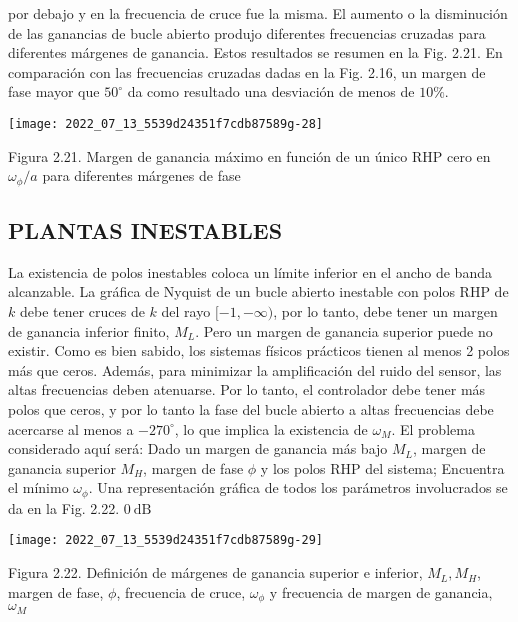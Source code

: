 por debajo y en la frecuencia de cruce fue la misma. El aumento o la disminución de las ganancias de bucle abierto produjo diferentes frecuencias cruzadas para diferentes márgenes de ganancia. Estos resultados se resumen en la Fig. 2.21. En comparación con las frecuencias cruzadas dadas en la Fig. 2.16, un margen de fase mayor que $50^{\circ}$ da como resultado una desviación de menos de $10 \%$.

\texttt{[image: 2022\_07\_13\_5539d24351f7cdb87589g-28]}

Figura 2.21. Margen de ganancia máximo en función de un único RHP cero en $\omega_{\phi} / a$ para diferentes márgenes de fase

\subsection{PLANTAS INESTABLES}
La existencia de polos inestables coloca un límite inferior en el ancho de banda alcanzable. La gráfica de Nyquist de un bucle abierto inestable con polos RHP de $k$ debe tener cruces de $k$ del rayo $[-1,-\infty)$, por lo tanto, debe tener un margen de ganancia inferior finito, $M_{L}$. Pero un margen de ganancia superior puede no existir. Como es bien sabido, los sistemas físicos prácticos tienen al menos 2 polos más que ceros. Además, para minimizar la amplificación del ruido del sensor, las altas frecuencias deben atenuarse. Por lo tanto, el controlador debe tener más polos que ceros, y por lo tanto la fase del bucle abierto a altas frecuencias debe acercarse al menos a $-270^{\circ}$, lo que implica la existencia de $\omega_{M}$. El problema considerado aquí será: Dado un margen de ganancia más bajo $M_{L}$, margen de ganancia superior $M_{H}$, margen de fase $\phi$ y los polos RHP del sistema; Encuentra el mínimo $\omega_{\phi}$. Una representación gráfica de todos los parámetros involucrados se da en la Fig. 2.22. $0 \mathrm{~dB}$

\texttt{[image: 2022\_07\_13\_5539d24351f7cdb87589g-29]}

Figura 2.22. Definición de márgenes de ganancia superior e inferior, $M_{L}, M_{H}$, margen de fase, $\phi$, frecuencia de cruce, $\omega_{\phi}$ y frecuencia de margen de ganancia, $\omega_{M}$

